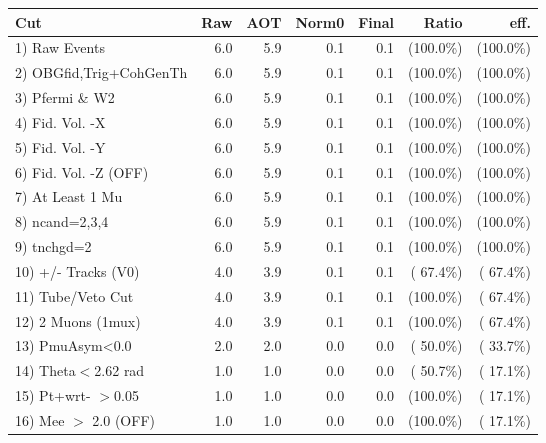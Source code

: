  \begin{table}[h!]\centering
 \begin{tabular}{||l||r|r|r|r|r|r||}
 \hline
 \hline
 Cut & Raw & AOT & Norm0 & Final & Ratio & eff.       \\
 \hline
  1) Raw Events           &          6.0 &          5.9 &          0.1 &          0.1 & (100.0\%) & (100.0\%) \\
  2) OBGfid,Trig+CohGenTh &          6.0 &          5.9 &          0.1 &          0.1 & (100.0\%) & (100.0\%) \\
  3) Pfermi \& W2         &          6.0 &          5.9 &          0.1 &          0.1 & (100.0\%) & (100.0\%) \\
  4) Fid. Vol. -X         &          6.0 &          5.9 &          0.1 &          0.1 & (100.0\%) & (100.0\%) \\
  5) Fid. Vol. -Y         &          6.0 &          5.9 &          0.1 &          0.1 & (100.0\%) & (100.0\%) \\
  6) Fid. Vol. -Z (OFF)   &          6.0 &          5.9 &          0.1 &          0.1 & (100.0\%) & (100.0\%) \\
  7) At Least 1 Mu        &          6.0 &          5.9 &          0.1 &          0.1 & (100.0\%) & (100.0\%) \\
  8) ncand=2,3,4          &          6.0 &          5.9 &          0.1 &          0.1 & (100.0\%) & (100.0\%) \\
  9) tnchgd=2             &          6.0 &          5.9 &          0.1 &          0.1 & (100.0\%) & (100.0\%) \\
 10) +/- Tracks (V0)      &          4.0 &          3.9 &          0.1 &          0.1 & ( 67.4\%) & ( 67.4\%) \\
 11) Tube/Veto Cut        &          4.0 &          3.9 &          0.1 &          0.1 & (100.0\%) & ( 67.4\%) \\
 12) 2 Muons (1mux)       &          4.0 &          3.9 &          0.1 &          0.1 & (100.0\%) & ( 67.4\%) \\
 13) PmuAsym<0.0          &          2.0 &          2.0 &          0.0 &          0.0 & ( 50.0\%) & ( 33.7\%) \\
 14) Theta$<$2.62 rad     &          1.0 &          1.0 &          0.0 &          0.0 & ( 50.7\%) & ( 17.1\%) \\
 15) Pt+wrt- $>$0.05      &          1.0 &          1.0 &          0.0 &          0.0 & (100.0\%) & ( 17.1\%) \\
 16) Mee $>$ 2.0  (OFF)   &          1.0 &          1.0 &          0.0 &          0.0 & (100.0\%) & ( 17.1\%) \\

\end{tabular}
\end{table}
